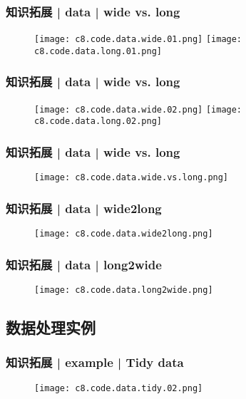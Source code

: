 \begin{frame}
  \frametitle{知识拓展 | data | wide vs. long}
  \begin{figure}
    \centering
    \texttt{[image: c8.code.data.wide.01.png]}
    \texttt{[image: c8.code.data.long.01.png]}
  \end{figure}
\end{frame}

\begin{frame}
  \frametitle{知识拓展 | data | wide vs. long}
  \begin{figure}
    \centering
    \texttt{[image: c8.code.data.wide.02.png]}
    \quad
    \texttt{[image: c8.code.data.long.02.png]}
  \end{figure}
\end{frame}

\begin{frame}
  \frametitle{知识拓展 | data | wide vs. long}
  \begin{figure}
    \centering
    \texttt{[image: c8.code.data.wide.vs.long.png]}
  \end{figure}
\end{frame}

\begin{frame}
  \frametitle{知识拓展 | data | wide2long}
  \begin{figure}
    \centering
    \texttt{[image: c8.code.data.wide2long.png]}
  \end{figure}
\end{frame}

\begin{frame}
  \frametitle{知识拓展 | data | long2wide}
  \begin{figure}
    \centering
    \texttt{[image: c8.code.data.long2wide.png]}
  \end{figure}
\end{frame}

\subsection{数据处理实例}
\begin{frame}
  \frametitle{知识拓展 | example | Tidy data}
  \begin{figure}
    \centering
    \texttt{[image: c8.code.data.tidy.02.png]}
  \end{figure}
\end{frame}

